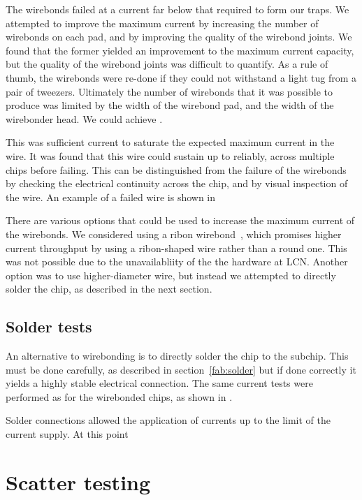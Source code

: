 The wirebonds failed at a current far below that required to form our traps. We
attempted to improve the maximum current by increasing the number of wirebonds
on each pad, and by improving the quality of the wirebond joints. We found that
the former yielded an improvement to the maximum current capacity, but the
quality of the wirebond joints was difficult to quantify. As a rule of thumb,
the wirebonds were re-done if they could not withstand a light tug from a pair
of tweezers. Ultimately the number of wirebonds that it was possible to produce
was limited by the width of the wirebond pad, and the width of the wirebonder
head. We could achieve .

This was sufficient current to saturate the expected maximum current in the
 wire. It was found that this wire could sustain up to
 reliably, across multiple chips before failing. This can be
distinguished from the failure of the wirebonds by checking the electrical
continuity across the chip, and by visual inspection of the wire. An example of
a failed wire is shown in 

There are various options that could be used to increase the maximum current of
the wirebonds.  We considered using a ribon wirebond~\cite{}, which promises
higher current throughput by using a ribon-shaped wire rather than a round one.
This was not possible due to the unavailabliity of the the hardware at LCN.
Another option was to use higher-diameter wire, but instead we attempted to
directly solder the chip, as described in the next section.

\subsection{Solder tests}

An alternative to wirebonding is to directly solder the chip to the subchip.
This must be done carefully, as described in section~\ref{fab:solder} but
if done correctly it yields a highly stable electrical connection.  The same current tests were performed as for the 
wirebonded chips, as shown in .

Solder connections allowed the application of currents up to the limit of the
current supply. At this point 


\section{Scatter testing}


